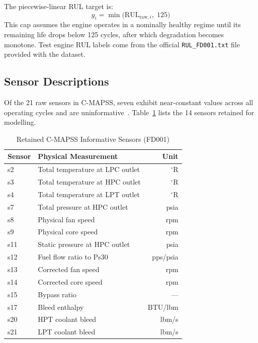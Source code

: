 \documentclass[10pt, journal, letterpaper]{IEEEtran}
\begin{document}
The piecewise-linear RUL target is:
\begin{equation}
  y_i = \min\!\bigl(\mathrm{RUL}_{\mathrm{raw},i},\; 125\bigr)
\end{equation}
This cap assumes the engine operates in a nominally healthy regime until its
remaining life drops below 125 cycles, after which degradation becomes
monotone. Test engine RUL labels come from the official
\texttt{RUL\_FD001.txt} file provided with the dataset.

\subsection{Sensor Descriptions}

Of the 21 raw sensors in C-MAPSS, seven exhibit near-constant values across
all operating cycles and are uninformative~\cite{asif2022}. Table~\ref{tab:sensors}
lists the 14 sensors retained for modelling.

\begin{table}[htbp]
\caption{Retained C-MAPSS Informative Sensors (FD001)}
\label{tab:sensors}
\centering\small
\begin{tabular}{llr}
\toprule
\textbf{Sensor} & \textbf{Physical Measurement} & \textbf{Unit} \\
\midrule
s2  & Total temperature at LPC outlet  & ${}^\circ$R \\
s3  & Total temperature at HPC outlet  & ${}^\circ$R \\
s4  & Total temperature at LPT outlet  & ${}^\circ$R \\
s7  & Total pressure at HPC outlet     & psia        \\
s8  & Physical fan speed               & rpm         \\
s9  & Physical core speed              & rpm         \\
s11 & Static pressure at HPC outlet    & psia        \\
s12 & Fuel flow ratio to Ps30          & pps/psia    \\
s13 & Corrected fan speed              & rpm         \\
s14 & Corrected core speed             & rpm         \\
s15 & Bypass ratio                     & ---         \\
s17 & Bleed enthalpy                   & BTU/lbm     \\
s20 & HPT coolant bleed                & lbm/s       \\
s21 & LPT coolant bleed                & lbm/s       \\
\bottomrule
\end{tabular}
\end{table}
\end{document}
